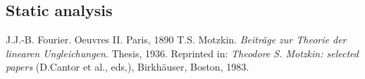 \documentclass[12pt, a4paper]{article}
\begin{document}
\begin{scriptsize}
\begin{ttfamily}

\end{ttfamily}
\end{scriptsize}

\subsection{Static analysis}

\begin{scriptsize}
\begin{ttfamily}

\end{ttfamily}
\end{scriptsize}

\begin{thebibliography}{9}
 J.J.-B. Fourier. Oeuvres II. Paris, 1890
 T.S. Motzkin. {\em Beitr\"{a}ge zur Theorie der linearen Ungleichungen}. Thesis, 1936. Reprinted in: {\em Theodore S. Motzkin: selected papers} (D.Cantor et al., eds,), Birkh\"{a}user, Boston, 1983.
\end{thebibliography}
\end{document}
